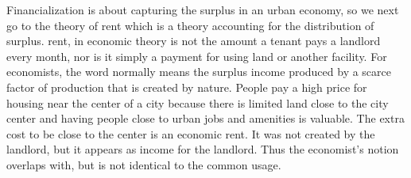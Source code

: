 

Financialization is about capturing the surplus in an urban economy, so we next go to the theory of rent which is a theory accounting for the distribution of surplus. 
\Gls{rent}, in economic theory is not the amount a tenant pays a landlord every month, nor is it simply a payment for using land or another facility.  For economists, the word normally means the \gls{surplus} income produced by a scarce factor of production that is created by nature. People pay a high price for housing near the center of a city because there is limited %
land close to the city center and having people close to urban jobs and amenities is valuable. The extra cost to be close to the center is an \gls{economic rent}. It was not created by the landlord, but it appears as income for the landlord. Thus the economist's notion overlaps with, but is not identical to the common usage. 

